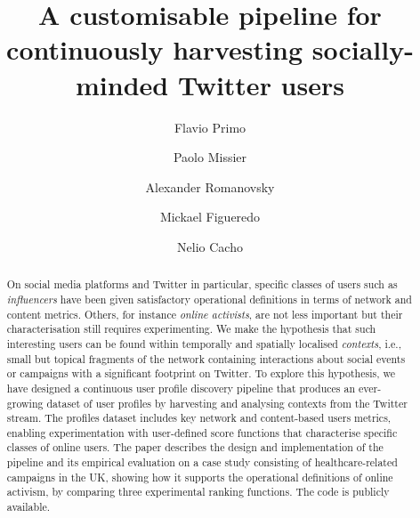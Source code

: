 \documentclass[runningheads]{llncs}
\begin{document}
    \title{A customisable pipeline for continuously harvesting socially-minded Twitter users}
    \author{Flavio Primo \and
    Paolo Missier \and
    Alexander Romanovsky \and
    Mickael Figueredo \and
    Nelio Cacho}
    
    \maketitle       %
    
    \begin{abstract}
    	On social media platforms and Twitter in particular, specific classes of users such as \textit{influencers}  have been given satisfactory operational definitions in terms of  network and content metrics.
    	Others, for instance \textit{online activists}, are not less important but their characterisation still requires experimenting.
    	We make  the hypothesis that such interesting users can be found within temporally and spatially localised \textit{contexts}, i.e., small but topical fragments of the network containing interactions about social events or campaigns with a significant footprint on Twitter.
    	To explore this hypothesis, we have designed a continuous user profile discovery pipeline that produces an ever-growing dataset of user profiles by harvesting and analysing contexts from the Twitter stream.
    	The profiles dataset includes key network and content-based users metrics, enabling experimentation with user-defined score functions that characterise specific classes of online users.
        The paper describes the design and implementation of  the pipeline and its empirical evaluation on a case study consisting of healthcare-related campaigns in the UK, showing how it supports the operational definitions of online activism, by comparing three experimental ranking functions. The code is publicly available.
    	
    \end{abstract}
\end{document}
